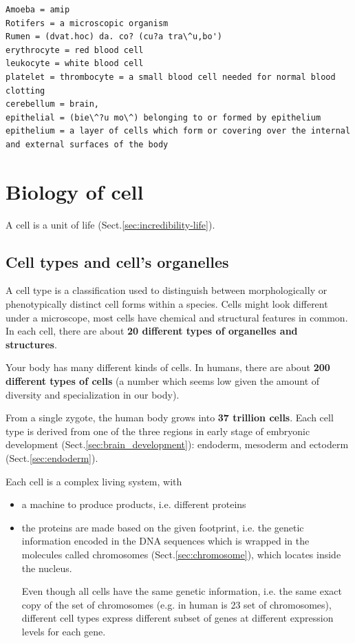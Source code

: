 \begin{verbatim}
Amoeba = amip
Rotifers = a microscopic organism
Rumen = (dvat.hoc) da. co? (cu?a tra\^u,bo')
erythrocyte = red blood cell
leukocyte = white blood cell
platelet = thrombocyte = a small blood cell needed for normal blood clotting 
cerebellum = brain,
epithelial = (bie\^?u mo\^) belonging to or formed by epithelium
epithelium = a layer of cells which form or covering over the internal and external surfaces of the body

\end{verbatim}


\chapter{Biology of cell}
\label{chap:cell-life}

A cell is a unit of life (Sect.\ref{sec:incredibility-life}).

\section{Cell types and cell's organelles}
\label{sec:cell-types}
\label{sec:cell-organelles}

A cell type is a classification used to distinguish between morphologically or
phenotypically distinct cell forms within a species. Cells might look different
under a microscope, most cells have chemical and structural features in common.
In each cell, there are about {\bf 20 different types of organelles and
structures}.

Your body has many different kinds of cells. In humans, there are about {\bf 200
different types of cells} (a number which seems low given the amount of
diversity and specialization in our body).

From a single zygote, the human body grows into {\bf 37 trillion cells}. Each
cell type is derived from one of the three regions in early stage of embryonic
development (Sect.\ref{sec:brain_development}): endoderm, mesoderm and ectoderm
(Sect.\ref{sec:endoderm}).

Each cell is a complex living system, with 
\begin{itemize}
  \item a machine to produce products, i.e. different proteins
  \item the proteins are made based on the given footprint, i.e. the genetic
  information encoded in the DNA sequences which is wrapped in the molecules
  called chromosomes (Sect.\ref{sec:chromosome}), which locates
  inside the nucleus.

Even though all cells have the same genetic information, i.e. the same exact
copy of the set of chromosomes (e.g. in human is 23 set of chromosomes),
different cell types express different subset of genes at different expression
levels for each gene.

\end{itemize}


